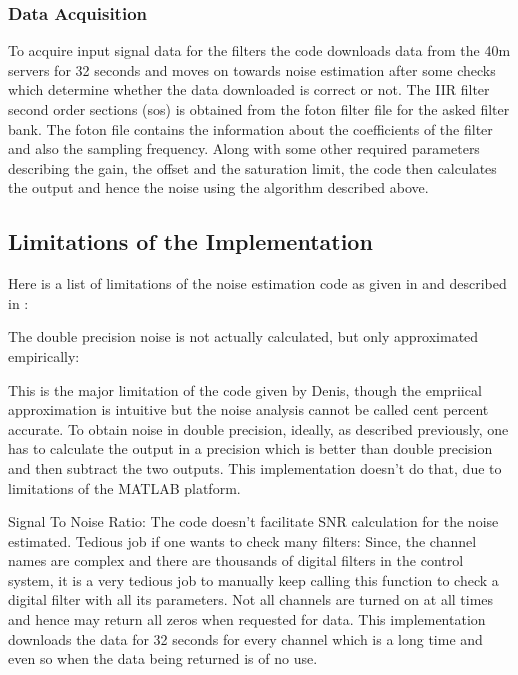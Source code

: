 \documentclass[colorlinks=true,pdfstartview=FitV,linkcolor=blue,
            citecolor=red,urlcolor=magenta]{ligodoc}
\begin{document}
		\subsubsection{Data Acquisition} To acquire input signal data for the filters the code downloads data from the 40m servers for 32 seconds and moves on towards noise estimation after some checks which determine whether the data downloaded is correct or not. The IIR filter second order sections (sos) is obtained from the foton filter file for the asked filter bank. The foton file contains the information about the coefficients of the filter and also the sampling frequency. Along with some other required parameters describing the gain, the offset and the saturation limit, the code then calculates the output and hence the noise using the algorithm described above.
	\subsection{Limitations of the Implementation}
	Here is a list of limitations of the noise estimation code as given in \cite{Den_code} and described in \cite{Den_thesis}:
		\begin{enumerate}
			\list The double precision noise is not actually calculated, but only approximated empirically: \\
				\begin{paragraph}This is the major limitation of the code given by Denis, though the empriical approximation is intuitive but the noise analysis cannot be called cent percent accurate. To obtain noise in double precision, ideally, as described previously, one has to calculate the output in a precision which is better than double precision and then subtract the two outputs. This implementation doesn't do that, due to limitations of the MATLAB platform.
				\end{paragraph}
			\list Signal To Noise Ratio: The code \cite{Den_code} doesn't facilitate SNR calculation for the noise estimated. 
			\list Tedious job if one wants to check many filters: Since, the channel names are complex and there are thousands of digital filters in the control system, it is a very tedious job to manually keep calling this function to check a digital filter with all its parameters. 
			\list Not all channels are turned on at all times and hence may return all zeros when requested for data. This implementation downloads the data for 32 seconds for every channel which is a long time and even so when the data being returned is of no use. 
	
		\end{enumerate}
		
\end{document}
